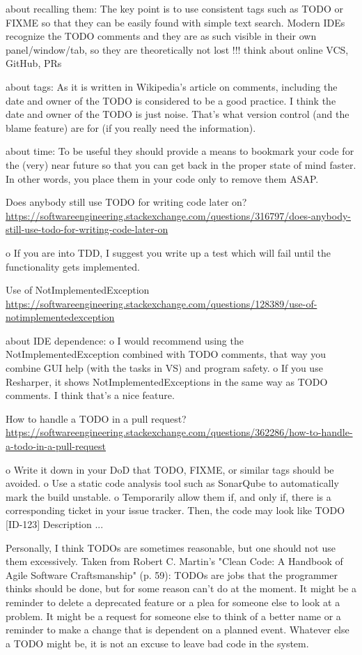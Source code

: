 about recalling them:
The key point is to use consistent tags such as TODO or FIXME so that they can be easily found with simple text search.
Modern IDEs recognize the TODO comments and they are as such visible in their own panel/window/tab, so they are theoretically not lost !!! think about online VCS, GitHub, PRs

about tags:
As it is written in Wikipedia's article on comments, including the date and owner of the TODO is considered to be a good practice.
I think the date and owner of the TODO is just noise. That's what version control (and the blame feature) are for (if you really need the information).

about time:
To be useful they should provide a means to bookmark your code for the (very) near future so that you can get back in the proper state of mind faster. In other words, you place them in your code only to remove them ASAP.


Does anybody still use TODO for writing code later on? \url{https://softwareengineering.stackexchange.com/questions/316797/does-anybody-still-use-todo-for-writing-code-later-on}

o If you are into TDD, I suggest you write up a test which will fail until the functionality gets implemented.

Use of NotImplementedException \url{https://softwareengineering.stackexchange.com/questions/128389/use-of-notimplementedexception}

about IDE dependence:
o I would recommend using the NotImplementedException combined with TODO comments, that way you combine GUI help (with the tasks in VS) and program safety.
o If you use Resharper, it shows NotImplementedExceptions in the same way as TODO comments. I think that's a nice feature.

How to handle a TODO in a pull request? \url{https://softwareengineering.stackexchange.com/questions/362286/how-to-handle-a-todo-in-a-pull-request}

o Write it down in your DoD that TODO, FIXME, or similar tags should be avoided.
o Use a static code analysis tool such as SonarQube to automatically mark the build unstable.
o Temporarily allow them if, and only if, there is a corresponding ticket in your issue tracker. Then, the code may look like TODO [ID-123] Description ...

Personally, I think TODOs are sometimes reasonable, but one should not use them excessively. Taken from Robert C. Martin's "Clean Code: A Handbook of Agile Software Craftsmanship" (p. 59):
TODOs are jobs that the programmer thinks should be done, but for some reason can't do at the moment. It might be a reminder to delete a deprecated feature or a plea for someone else to look at a problem. It might be a request for someone else to think of a better name or a reminder to make a change that is dependent on a planned event. Whatever else a TODO might be, it is not an excuse to leave bad code in the system.

